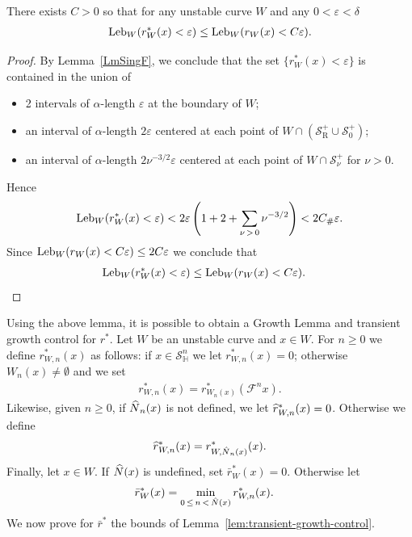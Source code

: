 \documentclass[AHL, Unicode, longabstracts,published]{cedram}
\newcommand{\eps}{\varepsilon}
\newcommand{\homo}{\mathbb{H}}
\newcommand{\cm}{\mathcal{F}}
\newcommand{\recoPrivate}{\mathrm{R}}
\newcommand{\singPrivate}{\mathcal{S}}
\newcommand{\hsing}[1]{{\singPrivate}_\homo^{#1}}
\newcommand{\singForward}[1]{\singPrivate^+_{#1}}
\newcommand{\admName}{\alpha^{+}}
\newcommand{\Np}{\hat N}
\newcommand{\Leb}{\textup{Leb}}
\newcommand{\indCell}{\nu}
\newcommand{\Const}{C_\#}
\renewcommand{\admName}{\alpha}
\let\oldhat\hat
\renewcommand*{\hat}[1]{\mathchoice{\widehat{#1}}{\widehat{#1}}{\oldhat{#1}}{\oldhat{#1}}}
\begin{document}
\begin{lemm}\label{lem:r-star-vs-r}
There exists $C > 0$ so that for any unstable curve $W$ and any $0 < \eps<\delta$
\begin{align*}
\Leb_{W}(r^{*}_{W}(x) < \eps)\le \Leb_W(r_{W}(x) < C\eps).
\end{align*}
\end{lemm}
\begin{proof}
By Lemma~\ref{LmSingF}, we conclude that the set $\{r_{W}^{*}(x) < \eps\}$ is contained in the union of
\begin{itemize}
\item 2 intervals of $\admName$-length $\eps$ at the boundary of $W$;

\item an interval of $\admName$-length $2\eps$ centered at each point of $W\cap(\singForward{\recoPrivate}\cup\singForward{0})$;

\item an interval of $\admName$-length $2\indCell^{-3/2}\eps$ centered at each point of $W\cap\singForward{\indCell}$ for $\nu>0$.
\end{itemize}

Hence
\begin{align*}
\Leb_{W}(r_{W}^{*}(x) < \eps) < 2\eps \left(1+2+\sum_{\indCell\,>\,0}\indCell^{-3/2}\right) < 2\Const\eps.
\end{align*}
Since $\Leb_{W}(r_{W}(x) < C\eps)\leq 2 C \eps$ we conclude that
\begin{align*}
\Leb_{W}(r_{W}^{*}(x) < \eps) & \le \Leb_{W}(r_{W}(x) < C\eps).\qedhere
\end{align*}
\end{proof}

Using the above lemma, it is possible to obtain a Growth Lemma and transient growth control for $r^{*}$. Let $W$ be an unstable curve and $x\in W$. For $n\ge0$ we define $r^{*}_{W,n}(x)$ as follows: if $x\in\hsing n$ we let $r^{*}_{W,n}(x) = 0$; otherwise $W_{n}(x)\ne\emptyset$ and we set
\begin{align*}
r^{*}_{W,n}(x) = r^{*}_{W_{n}(x)}(\cm^{n}x).
\end{align*}
Likewise, given $n\ge 0$, if $\Np_{n}(x)$ is not defined, we let $\hat r^{*}_{W,n}(x) = 0$. Otherwise we define
\begin{equation}\label{DefHatR}
\hat r^{*}_{W,n}(x) = r^{*}_{W,\Np_{n}(x)}(x).
\end{equation}
Finally, let $x\in W$. If $\Np(x)$ is undefined, set $\bar r^{*}_{W}(x) = 0$. Otherwise let
\begin{align*}
\bar r^{*}_{W}(x) &= \min_{0\,\le\,n\,<\,\Np(x)}r^{*}_{W,n}(x).
\end{align*}
We now prove for $\bar r^{*}$ the bounds of Lemma~\ref{lem:transient-growth-control}.
\end{document}

